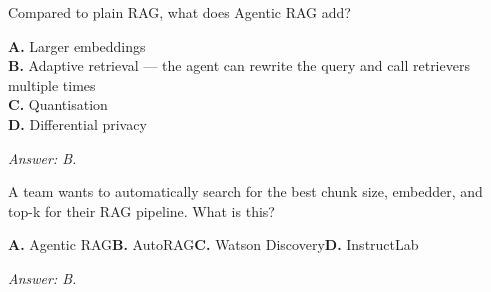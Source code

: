 \begin{practicebox}[title=\textbf{Q4.6 --- Agentic RAG}]
Compared to plain RAG, what does Agentic RAG add?

\textbf{A.} Larger embeddings\\
\textbf{B.} Adaptive retrieval --- the agent can rewrite the query and call retrievers multiple times\\
\textbf{C.} Quantisation\\
\textbf{D.} Differential privacy

\vspace{0.2cm}\textit{Answer: B.}
\end{practicebox}

\begin{practicebox}[title=\textbf{Q4.7 --- AutoRAG}]
A team wants to automatically search for the best chunk size, embedder, and top-k for their RAG pipeline. What is this?

\textbf{A.} Agentic RAG\hspace{1em}\textbf{B.} AutoRAG\hspace{1em}\textbf{C.} Watson Discovery\hspace{1em}\textbf{D.} InstructLab

\vspace{0.2cm}\textit{Answer: B.}
\end{practicebox}

\cleardoublepage
